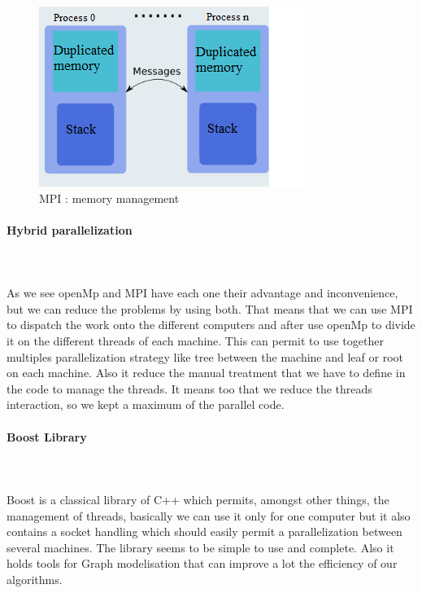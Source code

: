 \begin{figure}[!h] 
\centerline{\includegraphics[scale=0.85]{3_Software_considered/MultithreadingMP_boost_Visual_MPI_5000_Zotero_Project_Baptiste/MPI}}
   \caption{\label{étiquette} MPI : memory management}
\label{fig:MPI}
\end{figure}


\paragraph{Hybrid parallelization}\mbox{}\\\mbox{}\\
	As we see openMp and MPI have each one their advantage and inconvenience, but we can reduce the problems by using both. That means that we can use MPI to dispatch the work onto the different computers and after use openMp to divide it on the different threads of each machine. This can permit to use together multiples parallelization strategy like tree between the machine and leaf or root on each machine. Also it reduce the manual treatment that we have to define in the code to manage the threads. It means too that we reduce the threads interaction, so we kept a maximum of the parallel code.

\paragraph{Boost Library}\mbox{}\\\mbox{}\\
	Boost is a classical library of C++ which permits, amongst other things, the management of threads, basically we can use it only for one computer but it also contains a socket handling which should easily permit a parallelization between several machines. The library seems to be simple to use and complete. Also it holds tools for Graph modelisation that can improve a lot the efficiency of our algorithms.


